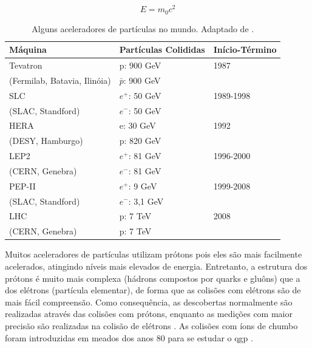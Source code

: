 
\begin{equation} \label{eq:einstein}
E=m_0c^2
\end{equation}

\begin{table}
\centering
\begin{tabular}{lll}
\hline \hline \hline
\textbf{Máquina} & \textbf{Partículas Colididas} & \textbf{Início-Término} \\
\hline \hline
Tevatron & p: 900 GeV & 1987 \\
(Fermilab, Batavia, Ilinóia) & $\bar{p}$: 900 GeV & \\
\hline
SLC & $e^{+}$: 50 GeV & 1989-1998 \\
(SLAC, Standford) & $e^{-}$: 50 GeV & \\
\hline
HERA & e: 30 GeV & 1992 \\
(DESY, Hamburgo) & p: 820 GeV & \\
\hline
LEP2 & $e^{+}$: 81 GeV & 1996-2000 \\
(CERN, Genebra) & $e^{-}$: 81 GeV & \\
\hline
PEP-II & $e^{+}$: 9 GeV & 1999-2008 \\
(SLAC, Standford) & $e^{-}$: 3,1 GeV & \\
\hline
LHC & p: 7 TeV & 2008 \\
(CERN, Genebra) & p: 7 TeV & \\
\hline \hline
\end{tabular}
\caption[Alguns aceleradores de partículas no mundo]{Alguns aceleradores de partículas no mundo. Adaptado de \cite{Intro_Standard}.}
\label{tab:aceleradores}
\end{table}


Muitos aceleradores de partículas utilizam prótons pois eles são mais facilmente
acelerados, atingindo níveis mais elevados de energia. Entretanto, a
estrutura dos prótons é muito mais complexa (hádrons
compostos por quarks e gluôns) que a dos elétrons (partícula elementar), de forma que as colisões com elétrons são 
de mais fácil compreensão. Como consequência, as
descobertas normalmente são realizadas através das colisões com prótons, enquanto as medições com
maior precisão são realizadas na colisão de elétrons \cite{nature_space_and_time}.
As colisões com íons de chumbo foram introduzidas em meados dos anos 80
para se estudar o \gls{qgp} \cite{heavy_ions}.

